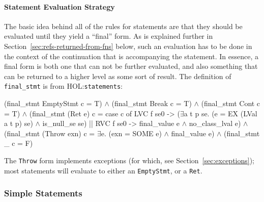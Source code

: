 \documentclass[11pt]{article}
\newcommand{\HOLfile}[1]{HOL:\texttt{#1}}
\begin{document}
\paragraph{Statement Evaluation Strategy}
The basic idea behind all of the rules for statements are that they
should be evaluated until they yield a ``final'' form.  As is
explained further in Section~\ref{sec:refs-returned-from-fns} below,
such an evaluation has to be done in the context of the continuation
that is accompanying the statement.  In essence, a final form is both
one that can not be further evaluated, and also something that can be
returned to a higher level as some sort of result.  The definition of
\texttt{final_stmt} is from \HOLfile{statements}:
\label{def:final-stmt}
%
%
\begin{stdrule}
  (final_stmt EmptyStmt c = T) \(\land\)
  (final_stmt Break c = T) \(\land\)
  (final_stmt Cont c = T) \(\land\)
  (final_stmt (Ret e) c =
     case c of
        LVC f se0 -> (\(\exists\)a t p se. (e = EX (LVal a t p) se) \(\land\)
                                 is_null_se se)
     || RVC f se0 -> final_value e \(\land\) no_class_lval e) \(\land\)
  (final_stmt (Throw exn) c = \(\exists\)e. (exn = SOME e) \(\land\)
                                  final_value e) \(\land\)
  (final_stmt _ c = F)
\end{stdrule}
%
%
%
The \texttt{Throw} form implements exceptions (for which, see
Section~\ref{sec:exceptions}); most statements will evaluate to either
an \texttt{EmptyStmt}, or a \texttt{Ret}.

\subsubsection{Simple Statements}
\label{sec:simple-statements}
\end{document}
